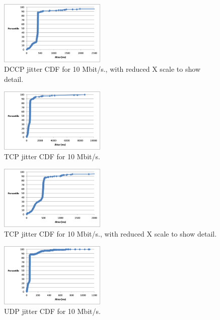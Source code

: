 \begin{figure}[!h]
   \centering
      \includegraphics[width=0.45\textwidth]{pics/dccp_10_jitter_closeup}
   \caption{DCCP jitter CDF for 10 Mbit/s., with reduced X scale to show detail.}
\label{fig:dccp_10_jitter_closeup}
\end{figure}

\begin{figure}[!h]
   \centering
      \includegraphics[width=0.45\textwidth]{pics/tcp_10_jitter}
   \caption{TCP jitter CDF for 10 Mbit/s.}
\label{fig:tcp_10_jitter}
\end{figure}

\begin{figure}[!h]
   \centering
      \includegraphics[width=0.45\textwidth]{pics/tcp_10_jitter_closeup}
   \caption{TCP jitter CDF for 10 Mbit/s., with reduced X scale to show detail.}
\label{fig:tcp_10_jitter_closeup}
\end{figure}

\begin{figure}[!h]
   \centering
      \includegraphics[width=0.45\textwidth]{pics/udp_10_jitter}
   \caption{UDP jitter CDF for 10 Mbit/s.}
\label{fig:udp_10_jitter}
\end{figure}


